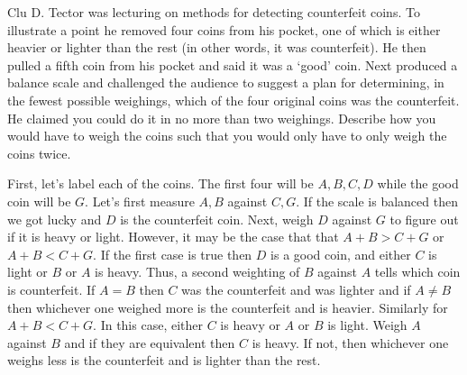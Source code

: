 \documentclass[10pt]{exam}
\begin{document}
\begin{questions}
 Clu D. Tector was lecturing on methods for detecting counterfeit coins. To illustrate a point he removed four coins from his pocket, one of which is either heavier or lighter than the rest (in other words, it was counterfeit). He then pulled a fifth coin from his pocket and said it was a `good' coin. Next produced a balance scale and challenged the audience to suggest a plan for determining, in the fewest possible weighings, which of the four original coins was the counterfeit. He claimed you could do it in no more than two weighings. Describe how you would have to weigh the coins such that you would only have to only weigh the coins twice.
\begin{solution}
	First, let's label each of the coins. The first four will be $A,B,C,D$ while the good coin will be $G$. Let's first measure $A,B$ against $C, G$. If the scale is balanced then we got lucky and $D$ is the counterfeit coin. Next, weigh $D$ against $G$ to figure out if it is heavy or light. However, it may be the case that that $A+B > C+G$ or $A+B <C+G$. If the first case is true then $D$ is a good coin, and either $C$ is light or $B$ or $A$ is heavy. Thus, a second weighting of $B$ against $A$ tells which coin is counterfeit. If $A=B$ then $C$ was the counterfeit and was lighter and if $A \not=B$ then whichever one weighed more is the counterfeit and is heavier. Similarly for $A+B<C+G$. In this case, either $C$ is heavy or $A$ or $B$ is light. Weigh $A$ against $B$ and if they are equivalent then $C$ is heavy. If not, then whichever one weighs less is the counterfeit and is lighter than the rest.
\end{solution}
\end{questions}
\end{document}
